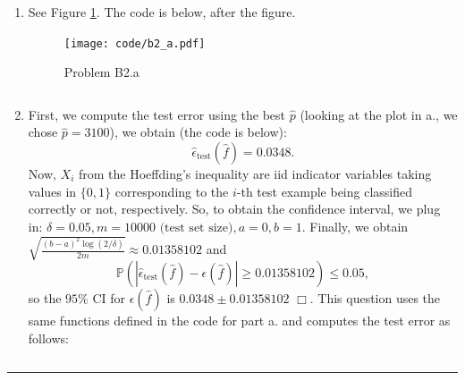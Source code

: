 \documentclass{article}
\newcommand{\1}{\mathbf{1}}
\renewcommand{\P}{\mathbb{P}}
\begin{document}
\begin{enumerate}
    \item See Figure \ref{figure:b2.a}. The code is below, after the figure.
         \begin{figure}[h!]
            \centering
            \texttt{[image: code/b2\_a.pdf]}
            \caption{Problem B2.a}
            \label{figure:b2.a}
         \end{figure}
         
         \inputminted{python}{code/B2_a.py}
          \caption{Code for B2.a}
          \label{listing:b2.a}
    \item First, we compute the test error using the best $\widehat p$ (looking at the plot in a., we chose $\widehat p = 3100$), we obtain (the code is below):
    $$
     \boxed{\widehat{\epsilon}_{\text{test}}(\widehat{f}) = 0.0348.}
    $$
    Now, $X_i$ from the Hoeffding's inequality are iid indicator variables taking values in $\{0,1\}$ corresponding to the $i$-th test example being classified correctly or not, respectively. So, to obtain the confidence interval, we plug in: $\delta = 0.05, m = 10000 \text{ (test set size)}, a=0, b=1$. Finally, we obtain $\sqrt{\frac{(b-a)^2 \log(2/\delta)}{2m}} \approx 0.01358102$ and
    $$
    \P \left( \left|\widehat{\epsilon}_{\text{test}}(\widehat{f})  - \epsilon(\widehat{f}) \right| \geq 0.01358102 \right)
                \leq 0.05,
    $$
    so the $95\%$ CI for $\epsilon(\widehat{f})$ is  $\boxed{0.0348 \pm 0.01358102}$ $\Box$.
    This question uses the same functions defined in the code for part a. and computes the test error as follows:
    \inputminted{python}{code/B2_b.py}
    
\end{enumerate}
\noindent\rule{\textwidth}{1pt}
\end{document}
